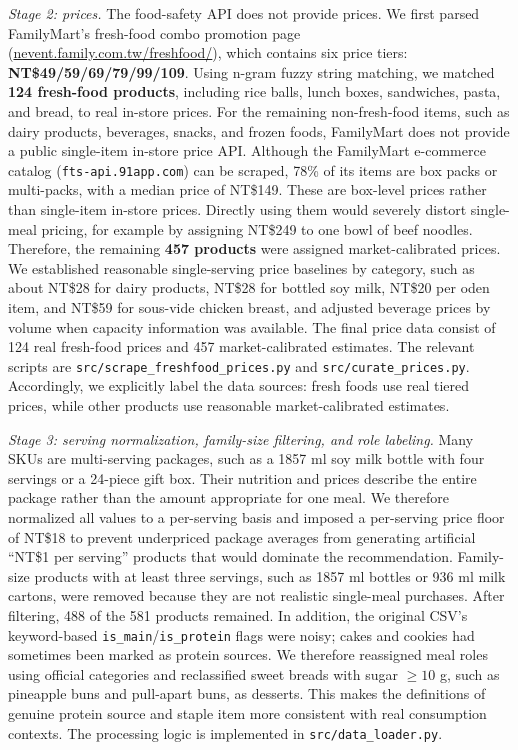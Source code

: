 \documentclass[a4paper]{article}
\begin{document}
\textit{Stage 2: prices.} The food-safety API does not provide prices. We first parsed FamilyMart's fresh-food combo promotion page (\url{nevent.family.com.tw/freshfood/}), which contains six price tiers: \textbf{NT\$49/59/69/79/99/109}. Using n-gram fuzzy string matching, we matched \textbf{124 fresh-food products}, including rice balls, lunch boxes, sandwiches, pasta, and bread, to real in-store prices. For the remaining non-fresh-food items, such as dairy products, beverages, snacks, and frozen foods, FamilyMart does not provide a public single-item in-store price API. Although the FamilyMart e-commerce catalog (\texttt{fts-api.91app.com}) can be scraped, 78\% of its items are box packs or multi-packs, with a median price of NT\$149. These are box-level prices rather than single-item in-store prices. Directly using them would severely distort single-meal pricing, for example by assigning NT\$249 to one bowl of beef noodles. Therefore, the remaining \textbf{457 products} were assigned market-calibrated prices. We established reasonable single-serving price baselines by category, such as about NT\$28 for dairy products, NT\$28 for bottled soy milk, NT\$20 per oden item, and NT\$59 for sous-vide chicken breast, and adjusted beverage prices by volume when capacity information was available. The final price data consist of 124 real fresh-food prices and 457 market-calibrated estimates. The relevant scripts are \texttt{src/scrape\_freshfood\_prices.py} and \texttt{src/curate\_prices.py}. Accordingly, we explicitly label the data sources: fresh foods use real tiered prices, while other products use reasonable market-calibrated estimates.

\textit{Stage 3: serving normalization, family-size filtering, and role labeling.} Many SKUs are multi-serving packages, such as a 1857 ml soy milk bottle with four servings or a 24-piece gift box. Their nutrition and prices describe the entire package rather than the amount appropriate for one meal. We therefore normalized all values to a per-serving basis and imposed a per-serving price floor of NT\$18 to prevent underpriced package averages from generating artificial ``NT\$1 per serving'' products that would dominate the recommendation. Family-size products with at least three servings, such as 1857 ml bottles or 936 ml milk cartons, were removed because they are not realistic single-meal purchases. After filtering, 488 of the 581 products remained. In addition, the original CSV's keyword-based \texttt{is\_main}/\texttt{is\_protein} flags were noisy; cakes and cookies had sometimes been marked as protein sources. We therefore reassigned meal roles using official categories and reclassified sweet breads with sugar $\ge 10$ g, such as pineapple buns and pull-apart buns, as desserts. This makes the definitions of genuine protein source and staple item more consistent with real consumption contexts. The processing logic is implemented in \texttt{src/data\_loader.py}.
\end{document}
